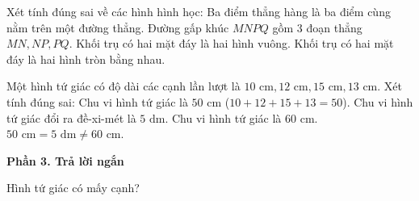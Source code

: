 \begin{ex} %
Xét tính đúng sai về các hình hình học:
\choiceTF
{\True Ba điểm thẳng hàng là ba điểm cùng nằm trên một đường thẳng.}
{\True Đường gấp khúc $MNPQ$ gồm 3 đoạn thẳng $MN, NP, PQ$.}
{Khối trụ có hai mặt đáy là hai hình vuông.}
{\True Khối trụ có hai mặt đáy là hai hình tròn bằng nhau.}
\end{ex}

\begin{ex} %
Một hình tứ giác có độ dài các cạnh lần lượt là $10\text{ cm}, 12\text{ cm}, 15\text{ cm}, 13\text{ cm}$. Xét tính đúng sai:
\choiceTF
{\True Chu vi hình tứ giác là $50\text{ cm}$ ($10 + 12 + 15 + 13 = 50$).}
{\True Chu vi hình tứ giác đổi ra đề-xi-mét là $5\text{ dm}$.}
{Chu vi hình tứ giác là $60\text{ cm}$.}
{\True $50\text{ cm} = 5\text{ dm} \neq 60\text{ cm}$.}
\end{ex}

\textbf{Phần 3. Trả lời ngắn}

\begin{ex} %
Hình tứ giác có mấy cạnh?
\end{ex}

